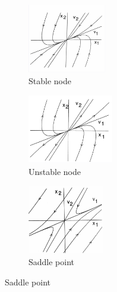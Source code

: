 \begin{figure}[!htb]
    \centering
    \begin{subfigure}{0.3\textwidth}
        \includegraphics[height=3cm]{figures/sn.png}
        \caption{Stable node}
    \end{subfigure}
    \begin{subfigure}{0.3\textwidth}
        \includegraphics[height=3cm]{figures/un.png}
        \caption{Unstable node}
    \end{subfigure}
    \begin{subfigure}{0.3\textwidth}
        \includegraphics[height=3cm]{figures/sp.png}
        \caption{Saddle point}
    \end{subfigure}
    \label{fig:phase_portraits1}
\end{figure}

